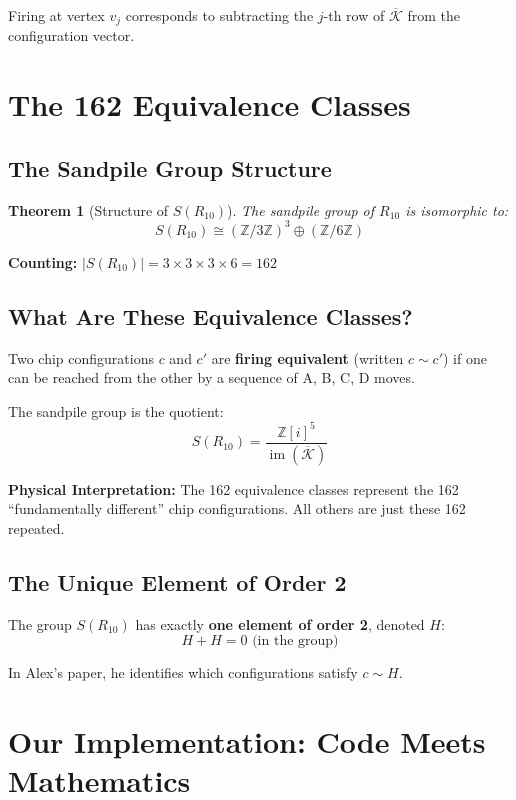 \documentclass[11pt]{article}
\newtheorem{theorem}{Theorem}
\newcommand{\Z}{\mathbb{Z}}
\DeclareMathOperator{\im}{im}
\begin{document}
Firing at vertex $v_j$ corresponds to subtracting the $j$-th row of $\overline{\mathcal{K}}$ from the configuration vector.

\section{The 162 Equivalence Classes}

\subsection{The Sandpile Group Structure}

\begin{theorem}[Structure of $S(R_{10})$]
The sandpile group of $R_{10}$ is isomorphic to:
\[
S(R_{10}) \cong (\Z/3\Z)^3 \oplus (\Z/6\Z)
\]
\end{theorem}

\textbf{Counting:} $|S(R_{10})| = 3 \times 3 \times 3 \times 6 = 162$

\subsection{What Are These Equivalence Classes?}

Two chip configurations $c$ and $c'$ are \textbf{firing equivalent} (written $c \sim c'$) if one can be reached from the other by a sequence of A, B, C, D moves.

The sandpile group is the quotient:
\[
S(R_{10}) = \frac{\Z[i]^5}{\im(\overline{\mathcal{K}})}
\]

\textbf{Physical Interpretation:} The 162 equivalence classes represent the 162 ``fundamentally different'' chip configurations. All others are just these 162 repeated.

\subsection{The Unique Element of Order 2}

The group $S(R_{10})$ has exactly \textbf{one element of order 2}, denoted $H$:
\[
H + H = 0 \text{ (in the group)}
\]

In Alex's paper, he identifies which configurations satisfy $c \sim H$.

\section{Our Implementation: Code Meets Mathematics}
\end{document}
